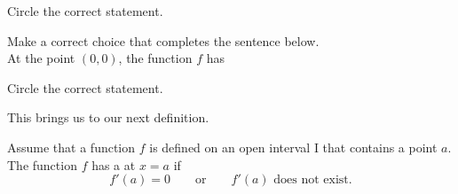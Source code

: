 \documentclass{ximera}
\begin{document}
  \begin{question}
Circle the correct statement.
  \begin{multipleChoice}
  \end{multipleChoice}
\end{question}
\begin{question}
 Make a correct choice that completes the sentence below. \\
 
  At the point $(0,0)$, the  function $f$ has 

  \begin{multipleChoice}
  \end{multipleChoice}
  \end{question}
  \begin{question}
Circle the correct statement.
  \begin{multipleChoice}
  \end{multipleChoice}
\end{question}

This brings us to our next definition.

\begin{definition}
  Assume that a function $f$ is defined on an open interval I that contains a point $a$. The  function $f$ has a  at $x=a$ if 
  \[
  f'(a) = 0\qquad\text{or}\qquad \text{$f'(a)$ does not exist.}
  \]
\end{definition}
\end{document}
